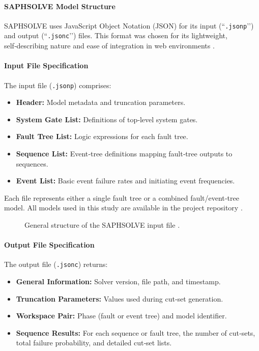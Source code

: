 \paragraph{SAPHSOLVE Model Structure}
SAPHSOLVE uses JavaScript Object Notation (JSON) \cite{37} for its input (``\texttt{.jsonp}’’) and output (``\texttt{.jsonc}’’) files. This format was chosen for its lightweight, self‑describing nature and ease of integration in web environments \cite{15}.

\paragraph{Input File Specification}
The input file (\texttt{.jsonp}) comprises:
\begin{itemize}
  \item \textbf{Header:} Model metadata and truncation parameters.
  \item \textbf{System Gate List:} Definitions of top‑level system gates.
  \item \textbf{Fault Tree List:} Logic expressions for each fault tree.
  \item \textbf{Sequence List:} Event‑tree definitions mapping fault‑tree outputs to sequences.
  \item \textbf{Event List:} Basic event failure rates and initiating event frequencies.
\end{itemize}
Each file represents either a single fault tree or a combined fault/event‑tree model. All models used in this study are available in the project repository \cite{38}.

\begin{figure}[htbp]
  \centering
  \caption{General structure of the SAPHSOLVE input file \cite{15}.}
  \label{fig:saphsolve_input}
\end{figure}

\paragraph{Output File Specification}
The output file (\texttt{.jsonc}) returns:
\begin{itemize}
  \item \textbf{General Information:} Solver version, file path, and timestamp.
  \item \textbf{Truncation Parameters:} Values used during cut‑set generation.
  \item \textbf{Workspace Pair:} Phase (fault or event tree) and model identifier.
  \item \textbf{Sequence Results:} For each sequence or fault tree, the number of cut‑sets, total failure probability, and detailed cut‑set lists.
\end{itemize}

